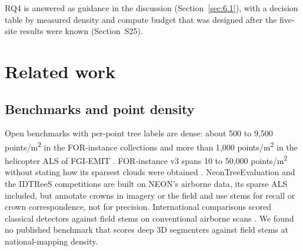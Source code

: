 \documentclass[preprint,12pt,authoryear,a4paper]{elsarticle}
\begin{document}
RQ4 is answered as guidance in the discussion (Section~\ref{sec:6.1}), with a decision
table by measured density and compute budget that was designed after the
five-site results were known (Section~S25).

\section{Related work}\label{sec:2}

\subsection{Benchmarks and point density}\label{sec:2.1}

Open benchmarks with per-point tree labels are dense: about 500 to 9,500
points/m\textsuperscript{2} in the FOR-instance collections \citep{puliti2023forinstance} and more than
1,000 points/m\textsuperscript{2} in the helicopter ALS of FGI-EMIT \citep{ruoppa2026benchmarking}.
FOR-instance v3 spans 10 to 50,000 points/m\textsuperscript{2} without stating how its sparsest
clouds were obtained \citep{wielgosz2026segmentanytreev2}. NeonTreeEvaluation
\citep{weinstein2021benchmark} and the IDTReeS competitions \citep{marconi2019data,graves2023data} are built on NEON's airborne data, its sparse ALS included, but
annotate crowns in imagery or the field and use stems for recall or crown
correspondence, not for precision. International comparisons scored classical
detectors against field stems on conventional airborne scans
\citep{kaartinen2012international,vauhkonen2012comparative,eysn2015benchmark,wang2016international}. We found no published benchmark that scores deep 3D
segmenters against field stems at national-mapping density.
\end{document}
